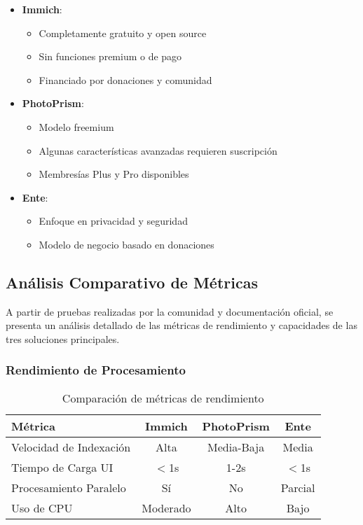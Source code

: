 \begin{itemize}
    \item \textbf{Immich}: 
    \begin{itemize}
        \item Completamente gratuito y open source
        \item Sin funciones premium o de pago
        \item Financiado por donaciones y comunidad
    \end{itemize}
    
    \item \textbf{PhotoPrism}:
    \begin{itemize}
        \item Modelo freemium
        \item Algunas características avanzadas requieren suscripción
        \item Membresías Plus y Pro disponibles
    \end{itemize}
    
    \item \textbf{Ente}:
    \begin{itemize}
        \item Enfoque en privacidad y seguridad
        \item Modelo de negocio basado en donaciones
    \end{itemize}
\end{itemize}

\subsection{Análisis Comparativo de Métricas}

A partir de pruebas realizadas por la comunidad y documentación oficial, se presenta un análisis detallado de las métricas de rendimiento y capacidades de las tres soluciones principales.

\subsubsection{Rendimiento de Procesamiento}

\begin{table}[H]
\centering
\begin{tabular}{|l|c|c|c|}
\hline
\textbf{Métrica} & \textbf{Immich} & \textbf{PhotoPrism} & \textbf{Ente} \\
\hline
Velocidad de Indexación & Alta & Media-Baja & Media \\
Tiempo de Carga UI & $<$1s & 1-2s & $<$1s \\
Procesamiento Paralelo & Sí & No & Parcial \\
Uso de CPU & Moderado & Alto & Bajo \\
\hline
\end{tabular}
\caption{Comparación de métricas de rendimiento}
\label{tab:performance_metrics}
\end{table}

